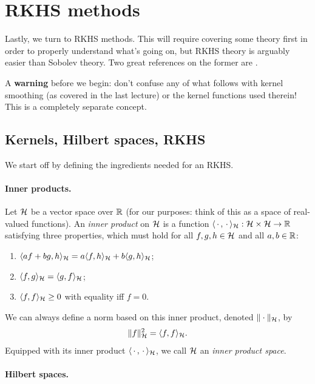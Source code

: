 \documentclass{article}
\begin{document}
\section{RKHS methods}

Lastly, we turn to RKHS methods. This will require covering some theory first in
order to properly understand what's going on, but RKHS theory is arguably easier
than Sobolev theory. Two great references on the former are
\citet{scholkopf2002learning, christmann2008support}.  

A \textbf{warning} before we begin: don't confuse any of what follows with
kernel smoothing (as covered in the last lecture) or the kernel functions used
therein! This is a completely separate concept. 

\subsection{Kernels, Hilbert spaces, RKHS}

We start off by defining the ingredients needed for an RKHS. 

\paragraph{Inner products.}

Let $\mathcal{H}$ be a vector space over $\mathbb{R}$ (for our purposes: think of this as a
space of real-valued functions). An \emph{inner product} on $\mathcal{H}$ is a function
$\langle \,\cdot\,, \,\cdot\, \rangle_{\mathcal{H}} : \mathcal{H} \times \mathcal{H} \to \mathbb{R}$ satisfying
three properties, which must hold for all $f,g,h \in \mathcal{H}$ and all $a,b \in \mathbb{R}$: 
\begin{enumerate}
\item $\langle af + bg, h \rangle_{\mathcal{H}} = a \langle f,h \rangle_{\mathcal{H}} + b \langle
  g,h \rangle_{\mathcal{H}}$;
\item $\langle f,g \rangle_{\mathcal{H}} = \langle g,f \rangle_{\mathcal{H}}$;
\item $\langle f,f \rangle_{\mathcal{H}} \geq 0$ with equality iff $f=0$. 
\end{enumerate}
We can always define a norm based on this inner product, denoted
$\|\cdot\|_{\mathcal{H}}$, by 
\[
\|f\|_{\mathcal{H}}^2 = \langle f, f \rangle_{\mathcal{H}}.
\]
Equipped with its inner product $\langle \,\cdot\,, \,\cdot\, \rangle_{\mathcal{H}}$, we
call $\mathcal{H}$ an \emph{inner product space}. 

\paragraph{Hilbert spaces.} 
\end{document}

